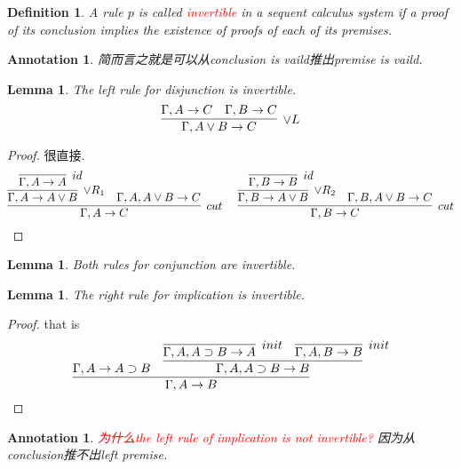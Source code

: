 \documentclass{article}
\theoremstyle{plain}
\newtheorem{lemma}[theorem]{Lemma}
\newtheorem{definition}[theorem]{Definition}
\newtheorem{annotation}[theorem]{Annotation}
\theoremstyle{nonumberplain}
\newtheorem{proof}{Proof}
\newcommand{\redt}[1]{\textcolor{red}{#1}}
\begin{document}
\begin{definition}
\rm A rule $p$ is called \redt{invertible} in a sequent calculus system if a proof of its conclusion implies the existence of proofs of each of its premises. 
\end{definition}

\begin{annotation}
\rm 简而言之就是可以从conclusion is vaild推出premise is vaild.
\end{annotation}

\begin{lemma}
\rm The left rule for disjunction is invertible.
$$
\infer[\vee L]{\Gamma, A \vee B \to C}{\Gamma, A \to C & \Gamma, B \to C}
$$
\end{lemma}

\begin{proof}
\rm 很直接.
$$
\infer[cut]{\Gamma, A \to C}{\infer[\vee R_1]{\Gamma, A \to A \vee B}{\infer[id]{\Gamma,A \to A}{}} & \Gamma, A, A \vee B  \to C} ~~~~ \infer[cut]{\Gamma, B \to C}{\infer[\vee R_2]{\Gamma, B \to A \vee B}{\infer[id]{\Gamma,B \to B}{}} & \Gamma, B,A \vee B \to C}
$$
\end{proof}

\begin{lemma}
\rm Both rules for conjunction are invertible.
\end{lemma}

\begin{lemma}
\rm The right rule for implication is invertible.
\end{lemma}

\begin{proof}
\rm that is
$$
\infer[]{\Gamma, A \to B}{\Gamma, A \to A \supset B & \infer{\Gamma,A, A\supset B \to B}{\infer[init]{\Gamma, A, A \supset B \to A}{} & \infer[init]{\Gamma,A, B \to B}{}}}
$$
\end{proof}

\begin{annotation}
\rm \redt{为什么the left rule of implication is not invertible?} 因为从conclusion推不出left premise. 
\end{annotation}
\end{document}

